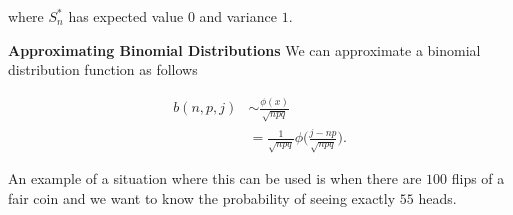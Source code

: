 \documentclass[12pt]{article}
\begin{document}
\noindent
where $S_n^*$ has expected value $0$ and variance $1$.

\vspace*{.3cm}
\noindent
\textbf{Approximating Binomial Distributions}
\noindent
We can approximate a binomial distribution function as follows

\begin{align*}
b(n,p,j) &\sim \frac{\phi(x)}{\sqrt{npq}} \\
&= \frac{1}{\sqrt{npq}} \phi \Bigg ( \frac{j - np}{\sqrt{npq}} \Bigg ).
\end{align*}

\noindent
An example of a situation where this can be used is when there are $100$ flips of a fair coin and we want to know the probability of seeing exactly $55$ heads.

\end{document}
